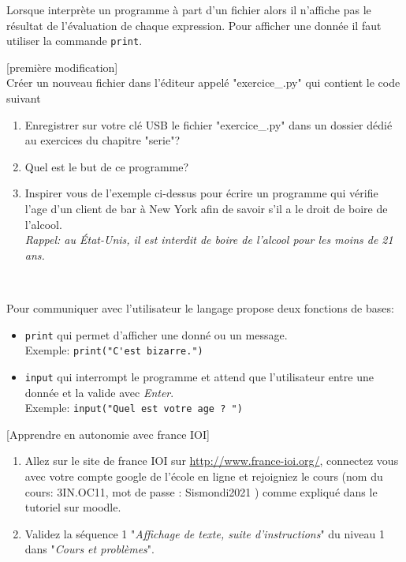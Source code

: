 \documentclass[a4paper,12pt]{article}
\begin{document}
\begin{eclairage}
	Lorsque \py interprète un programme à part d'un fichier alors il n'affiche pas le résultat de l'évaluation de chaque expression. Pour afficher une donnée il faut utiliser la commande \lstinline{print}.
\end{eclairage}


\exo{}[première modification]  ~\\ 
	Créer un nouveau fichier dans l'éditeur appelé "exercice\_\getexocompteur.py" qui contient le code suivant
	

	\begin{enumerate}
		\item Enregistrer sur votre clé USB le fichier "exercice\_\getexocompteur.py" dans un dossier dédié au exercices du chapitre "serie\thesection"?
		\item Quel est le but de ce programme?
		\item Inspirer vous de l'exemple ci-dessus pour écrire un programme qui vérifie l'age d'un client de bar à New York afin de savoir s'il a le droit de boire de l'alcool.\\ \textit{Rappel: au État-Unis, il est interdit de boire de l'alcool pour les moins de 21 ans.}
	\end{enumerate}
	\begin{correction}
		~\\ \vspace{-5pt}
		
	\end{correction}
\finexo

\begin{apprendre}
	Pour communiquer avec l'utilisateur le langage \py propose deux fonctions de bases:
	\begin{itemize}
		\item \lstinline{print} qui permet d'afficher une donné ou un message.\\
		Exemple: \lstinline{print("C'est bizarre.")}
		\item \lstinline{input} qui interrompt le programme et attend que l'utilisateur entre une donnée et la valide avec \textit{Enter}.\\
		Exemple: \lstinline{input("Quel est votre age ? ")}
	\end{itemize}
\end{apprendre}

\exo{}[Apprendre en  autonomie avec france IOI]  ~\\ 
	\begin{enumerate}
		\item Allez sur le site de france IOI sur \url{http://www.france-ioi.org/}, connectez vous avec votre compte google de l'école en ligne et rejoigniez le cours (nom du cours: 3IN.OC11, mot de passe : Sismondi2021 ) comme expliqué dans le tutoriel sur moodle.
		\item Validez la séquence 1 "\textit{Affichage de texte, suite d'instructions}" du niveau 1 dans "\textit{Cours et problèmes}".
	\end{enumerate}
\finexo
\end{document}
